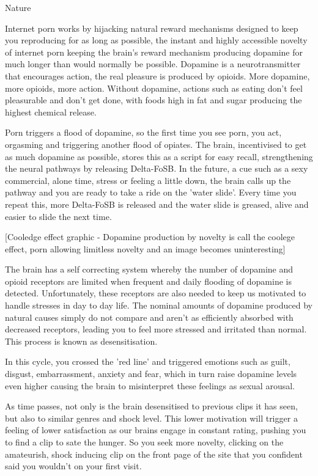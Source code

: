 Nature

Internet porn works by hijacking natural reward mechanisms designed to keep you reproducing for as long as possible, the instant and highly accessible novelty of internet porn keeping the brain's reward mechanism producing dopamine for much longer than would normally be possible. Dopamine is a neurotransmitter that encourages action, the real pleasure is produced by opioids. More dopamine, more opioids, more action. Without dopamine, actions such as eating don't feel pleasurable and don't get done, with foods high in fat and sugar producing the highest chemical release.

Porn triggers a flood of dopamine, so the first time you see porn, you act, orgasming and triggering another flood of opiates. The brain, incentivised to get as much dopamine as possible, stores this as a script for easy recall, strengthening the neural pathways by releasing Delta-FoSB. In the future, a cue such as a sexy commercial, alone time, stress or feeling a little down, the brain calls up the pathway and you are ready to take a ride on the 'water slide'. Every time you repeat this, more Delta-FoSB is released and the water slide is greased, alive and easier to slide the next time.

[Cooledge effect graphic - Dopamine production by novelty is call the coolege effect, porn allowing limitless novelty and an image becomes uninteresting]

The brain has a self correcting system whereby the number of dopamine and opioid receptors are limited when frequent and daily flooding of dopamine is detected. Unfortunately, these receptors are also needed to keep us motivated to handle stresses in day to day life. The nominal amounts of dopamine produced by natural causes simply do not compare and aren't as efficiently absorbed with decreased receptors, leading you to feel more stressed and irritated than normal. This process is known as desensitisation.

In this cycle, you crossed the 'red line' and triggered emotions such as guilt, disgust, embarrassment, anxiety and fear, which in turn raise dopamine levels even higher causing the brain to misinterpret these feelings as sexual arousal.

As time passes, not only is the brain desensitised to previous clips it has seen, but also to similar genres and shock level. This lower motivation will trigger a feeling of lower satisfaction as our brains engage in constant rating, pushing you to find a clip to sate the hunger. So you seek more novelty, clicking on the amateurish, shock inducing clip on the front page of the site that you confident said you wouldn't on your first visit.

